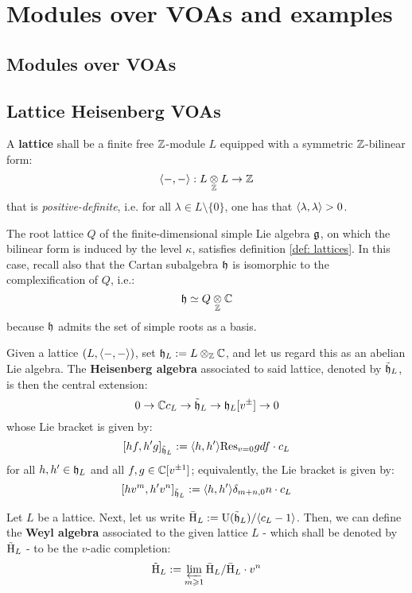 \section{Modules over VOAs and examples}
    \subsection{Modules over VOAs}

    \subsection{Lattice Heisenberg VOAs}
        \begin{definition}[Lattices] \label{def: lattices}
            A \textbf{lattice} shall be a finite free $\mathbb{Z}$-module $L$ equipped with a symmetric $\mathbb{Z}$-bilinear form:
                $$\<-, -\>: L \tensor_{\Z} L \to \Z$$
            that is \textit{positive-definite}, i.e. for all $\lambda \in L \setminus \{0\}$, one has that $\langle\lambda, \lambda\rangle > 0$.
        \end{definition}
        \begin{example}
            The root lattice $Q$ of the finite-dimensional simple Lie algebra $\mathfrak{g}$, on which the bilinear form is induced by the level $\kappa$, satisfies definition \ref{def: lattices}. In this case, recall also that the Cartan subalgebra $\mathfrak{h}$ is isomorphic to the complexification of $Q$, i.e.:
                $$\h \cong Q \tensor_{\Z} \bbC$$
            because $\mathfrak{h}$ admits the set of simple roots as a basis.
        \end{example}

        \begin{definition} \label{def: lattice_heisenberg_algebras} 
            Given a lattice $(L, \langle-, -\rangle)$, set $\h_L := L \tensor_{\Z} \bbC$, and let us regard this as an abelian Lie algebra. The \textbf{Heisenberg algebra} associated to said lattice, denoted by $\tilde{\mathfrak{h}}_L$, is then the central extension:
                $$0 \to \mathbb{C} c_L \to \tilde{\mathfrak{h}}_L \to \mathfrak{h}_L[v^{\pm}] \to 0$$
            whose Lie bracket is given by:
                $$[ h f, h' g ]_{\tilde{\mathfrak{h}}_L} := \langle h, h'\rangle \mathrm{Res}_{v = 0} g df \cdot c_L$$
            for all $h, h' \in \mathfrak{h}_L$ and all $f, g \in \mathbb{C}[v^{\pm 1}]$; equivalently, the Lie bracket is given by:
                $$[h v^m, h' v^n]_{\tilde{\mathfrak{h}}_L} := \langle h, h'\rangle \delta_{m + n, 0} n \cdot c_L$$
        \end{definition}
        \begin{definition} \label{def: lattice_weyl_algebras}
            Let $L$ be a lattice. Next, let us write $\bar{\mathrm{H}}_L := \mathrm{U}(\tilde{\mathfrak{h}}_L)/\langle c_L - 1\rangle$. Then, we can define the \textbf{Weyl algebra} associated to the given lattice $L$ - which shall be denoted by $\tilde{\mathrm{H}}_L$ - to be the $v$-adic completion:
                $$\tilde{\mathrm{H}}_L := \varprojlim_{m \geqslant 1} \bar{\mathrm{H}}_L/\bar{\mathrm{H}}_L \cdot v^n$$
        \end{definition}

